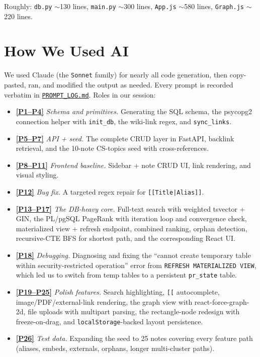 \documentclass[11pt,a4paper]{article}
\newcommand{\prm}[1]{\href{PROMPT_LOG.md}{\textbf{[P#1]}}}
\newcommand{\prms}[2]{\href{PROMPT_LOG.md}{\textbf{[P#1--P#2]}}}
\begin{document}
Roughly: \verb|db.py| $\sim$130 lines, \verb|main.py| $\sim$300 lines, \verb|App.js| $\sim$580 lines, \verb|Graph.js| $\sim$220 lines.

\section{How We Used AI}

We used Claude (the \texttt{Sonnet} family) for nearly all code generation, then copy-pasted, ran, and modified the output as needed. Every prompt is recorded verbatim in \href{PROMPT_LOG.md}{\texttt{PROMPT\_LOG.md}}. Roles in our session:

\begin{itemize}[leftmargin=1.2em,itemsep=1pt,topsep=2pt]
\item \prms{1}{4} \emph{Schema and primitives.} Generating the SQL schema, the psycopg2 connection helper with \texttt{init\_db}, the wiki-link regex, and \texttt{sync\_links}.
\item \prms{5}{7} \emph{API + seed.} The complete CRUD layer in FastAPI, backlink retrieval, and the 10-note CS-topics seed with cross-references.
\item \prms{8}{11} \emph{Frontend baseline.} Sidebar + note CRUD UI, link rendering, and visual styling.
\item \prm{12} \emph{Bug fix.} A targeted regex repair for \texttt{[[Title|Alias]]}.
\item \prms{13}{17} \emph{The DB-heavy core.} Full-text search with weighted tsvector + GIN, the PL/pgSQL PageRank with iteration loop and convergence check, materialized view + refresh endpoint, combined ranking, orphan detection, recursive-CTE BFS for shortest path, and the corresponding React UI.
\item \prm{18} \emph{Debugging.} Diagnosing and fixing the ``cannot create temporary table within security-restricted operation'' error from \texttt{REFRESH MATERIALIZED VIEW}, which led us to switch from temp tables to a persistent \texttt{pr\_state} table.
\item \prms{19}{25} \emph{Polish features.} Search highlighting, \texttt{[[} autocomplete, image/PDF/external-link rendering, the graph view with react-force-graph-2d, file uploads with multipart parsing, the rectangle-node redesign with freeze-on-drag, and \texttt{localStorage}-backed layout persistence.
\item \prm{26} \emph{Test data.} Expanding the seed to 25 notes covering every feature path (aliases, embeds, externals, orphans, longer multi-cluster paths).
\end{itemize}
\end{document}

